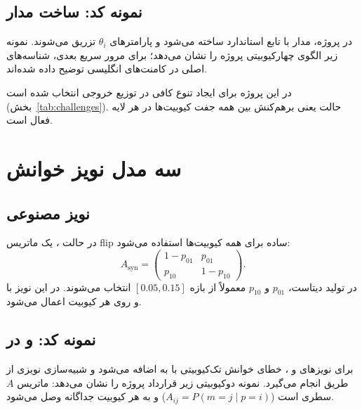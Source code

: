 \subsection{نمونه کد: ساخت مدار }

در پروژه، مدار  با تابع استاندارد  ساخته می‌شود و پارامترهای $\theta_i$ تزریق می‌شوند. نمونه زیر الگوی چهارکیوبیتی پروژه را نشان می‌دهد؛ برای مرور سریع بعدی، شناسه‌های اصلی در کامنت‌های انگلیسی توضیح داده شده‌اند.


در این پروژه  برای ایجاد تنوع کافی در توزیع خروجی انتخاب شده است (بخش~\ref{tab:challenges}). حالت  یعنی برهم‌کنش  بین همه جفت کیوبیت‌ها در هر لایه فعال است.

\section*{سه مدل نویز خوانش}

\subsection*{نویز مصنوعی}

در حالت ، یک ماتریس flip ساده برای همه کیوبیت‌ها استفاده می‌شود:
\begin{equation}
	A_{\mathrm{syn}}
	=
	\begin{pmatrix}
	1-p_{01} & p_{01}\\
	p_{10} & 1-p_{10}
	\end{pmatrix}.
	\label{eq:synthetic}
\end{equation}
در تولید دیتاست، $p_{01}$ و $p_{10}$ معمولاً از بازه $[0.05,0.15]$ انتخاب می‌شوند. در  این نویز با  و  روی هر کیوبیت اعمال می‌شود.

\subsection*{نمونه کد:  و  در }

برای نویزهای  و ، خطای خوانش تک‌کیوبیتی با  به  اضافه می‌شود و شبیه‌سازی نویزی از طریق  انجام می‌گیرد. نمونه دوکیوبیتی زیر قرارداد پروژه را نشان می‌دهد: ماتریس $A$ سطری است ($A_{ij}=P(m=j\mid p=i)$) و به هر کیوبیت جداگانه وصل می‌شود.

